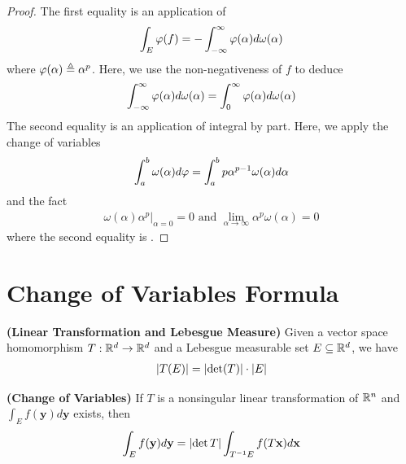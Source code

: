 \documentclass{report}
\begin{document}
\begin{proof}
The first equality is an application of 
\begin{align*}
\int_E \pfi(f)= - \int_{-\infty}^{\infty} \pfi (\alpha )  d \omega (\alpha )
\end{align*}
where $\pfi(\alpha )\triangleq \alpha ^p$. Here, we use the non-negativeness of $f$ to deduce 
 \begin{align*}
\int_{-\infty}^{\infty} \pfi (\alpha )d \omega (\alpha )= \int_{0}^{\infty} \pfi (\alpha )d \omega (\alpha )
\end{align*}
The second equality is an application of integral by part. Here, we apply the change of variables 
\begin{align*}
\int_a^b \omega (\alpha ) d \pfi = \int_a^b p \alpha ^{p-1}\omega (\alpha )d \alpha 
\end{align*}
and the fact 
\begin{align*}
\omega (\alpha )\alpha^p\Big|_{\alpha =0}=0\text{ and }\lim_{\alpha \to \infty} \alpha ^p\omega (\alpha )=0 
\end{align*}
where the second equality is . 
\end{proof}
\section{Change of Variables Formula}
\begin{theorem}
  \textbf{(Linear Transformation and Lebesgue Measure)} Given a vector space homomorphism $T:\mathbb{R}^d\rightarrow \mathbb{R}^d$ and a Lebesgue measurable set $E\subseteq \mathbb{R}^d$, we have 
\begin{align*}
\left|T(E)\right| = \left|\operatorname{det}(T)\right|\cdot \left|E\right|  
\end{align*}
\end{theorem}
\begin{theorem}
\textbf{(Change of Variables)} If $T$ is a nonsingular linear transformation of $\mathbb{R}^n$ and  $\int_E f(\textbf{y})d\textbf{y}$ exists, then 
\begin{align*}
\int_E f(\textbf{y})d\textbf{y}= \left|\operatorname{det}T\right|\int_{T^{-1}E}f(T\textbf{x})d\textbf{x}
\end{align*}
\end{theorem}
\end{document}
